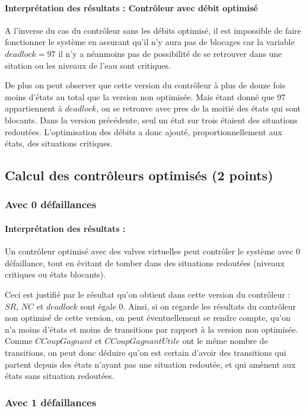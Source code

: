 \documentclass[a4paper]{book}
\begin{document}
\paragraph{Interprétation des résultats : Contrôleur avec débit optimisé}
A l'inverse du cas du contrôleur sans les débits optimisé, il est impossible de faire fonctionner le système en assurant qu'il n'y aura pas de blocages car la variable $deadlock = 97$
il n'y a néanmoins pas de possibilité de se retrouver dans une sitation ou les niveaux de l'eau sont critiques.

De plus on peut observer que cette version du contrôleur à plus de douze fois moins d'états au total que la version non optimisée. Mais étant donné que 97 appartiennent à $deadlock$, on se retrouve avec pres de la moitié des états qui sont blocants.
Dans la version précédente, seul un état sur trois étaient des situations redoutées. L'optimisation des débits a donc ajouté, proportionnellement aux états, des situations critiques.

\subsection{Calcul des contrôleurs optimisés (2 points)}
\subsubsection{Avec 0 défaillances}

\paragraph{Interprétation des résultats : }
Un contrôleur optimisé avec des valves virtuelles peut contrôler le système avec 0 défaillance, tout en évitant de tomber dans des situations redoutées (niveaux critiques ou états blocants).

Ceci est justifié par le résultat qu'on obtient dans cette version du contrôleur : $SR$, $NC$ et $deadlock$ sont égale $0$. Ainsi, si on regarde les résultats du contrôleur non optimisé de cette version,
on peut éventuellement se rendre compte, qu'on n'a moins d'états et moins de transitions par rapport à la version non optimisée. Comme $CCoupGagnant$ et $CCoupGagnantUtile$ ont le même nombre de transitions,
on peut donc déduire qu'on est certain d'avoir des transitions qui partent depuis des états n'ayant pas une situation redoutée, et qui amènent aux états sans situation redoutées.

\subsubsection{Avec 1 défaillances}

\end{document}

